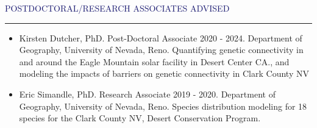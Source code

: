 \documentclass{resume} %
\renewenvironment{rSection}[1]{
\sectionskip
\textcolor{MidnightBlue}{\MakeUppercase{#1}}
\sectionlineskip
\hrule
\begin{list}{}{
\setlength{\leftmargin}{1.5em}
}
\item[]
}{
\end{list}
}
\begin{document}
\begin{rSection}{Postdoctoral/Research Associates Advised}
\begin{itemize}

\item Kirsten Dutcher, PhD. Post-Doctoral Associate 2020 - 2024. Department of Geography, University of Nevada, Reno.
 Quantifying genetic connectivity in and around the Eagle Mountain solar facility in Desert Center CA., and modeling the impacts of barriers on genetic connectivity in Clark County NV
 
 \item Eric Simandle, PhD. Research Associate 2019 - 2020. Department of Geography, University of Nevada, Reno.
 Species distribution modeling for 18 species for the Clark County NV, Desert Conservation Program.
 \end{itemize}
 \end{rSection}
\end{document}

